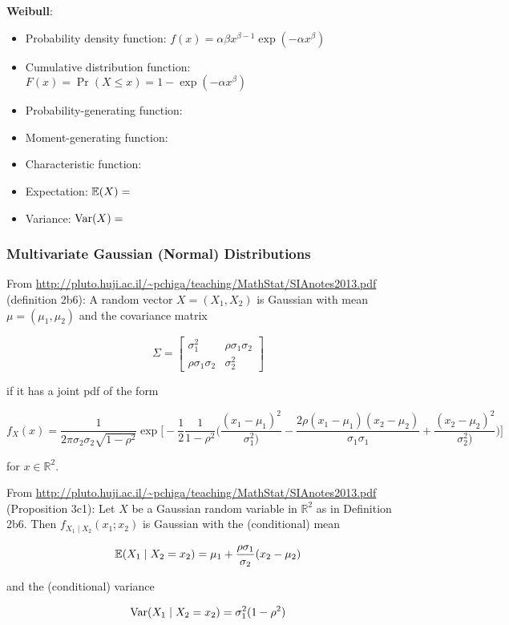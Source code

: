 \textbf{Weibull}: 

\begin{itemize}

\item Probability density function: \(f(x) = \alpha\beta x^{\beta - 1} \exp(- \alpha x^\beta) \)

\item Cumulative distribution function: \(F(x) = \Pr(X \leq x) = 1 - \exp(-\alpha x^\beta) \)

\item Probability-generating function:

\item Moment-generating function:

\item Characteristic function:

\item Expectation: \(\E(X) = \)

\item Variance: \(\Var(X) = \)

\end{itemize}


\subsubsection{Multivariate Gaussian (Normal) Distributions}

\begin{definition} From \url{http://pluto.huji.ac.il/~pchiga/teaching/MathStat/SIAnotes2013.pdf} (definition 2b6): A random vector \(X = (X_1, X_2)\) is Gaussian with mean \(\mu = (\mu_1, \mu_2)\) and the covariance matrix

\[
\Sigma = \begin{bmatrix}
   \sigma_1^2 & \rho \sigma_1 \sigma_2 \\
     \rho \sigma_1 \sigma_2     &\sigma_2^2
\end{bmatrix}
\]

if it has a joint pdf of the form

\[
f_X(x) = \frac{1}{2 \pi \sigma_2 \sigma_2 \sqrt{1 - \rho^2}} \exp \bigg[ - \frac{1}{2} \frac{1}{1 - \rho^2} \bigg( \frac{(x_1 - \mu_1)^2}{\sigma_1^2)} - \frac{2 \rho (x_1 - \mu_1)(x_2 - \mu_2)}{\sigma_1 \sigma_1} +  \frac{(x_2 - \mu_2)^2}{\sigma_2^2)} \bigg) \bigg]
\]

for \(x \in \mathbb{R}^2\).
\end{definition}

\begin{proposition}

From \url{http://pluto.huji.ac.il/~pchiga/teaching/MathStat/SIAnotes2013.pdf} (Proposition 3c1): Let \(X\) be a Gaussian random variable in \(\mathbb{R}^2\) as in Definition 2b6. Then \(f_{X_1 \mid X_2}(x_1; x_2)\) is Gaussian with the (conditional) mean

\[
\E(X_1 \mid X_2 = x_2) = \mu_1 + \frac{\rho \sigma_1}{\sigma_2} (x_2 - \mu_2)
\]

and the (conditional) variance

\[
\Var(X_1 \mid X_2 = x_2) = \sigma_1^2 (1 - \rho^2)
\]
\end{proposition} 

